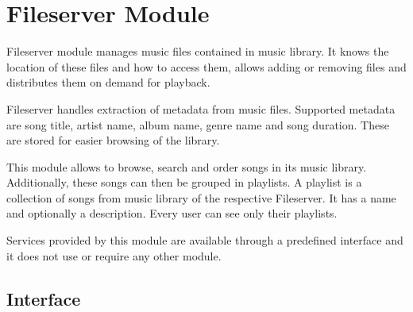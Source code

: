 \section{Fileserver Module}

Fileserver module manages music files contained in music library. It knows the location of these files and how to access them, allows adding or removing files and distributes them on demand for playback.
\par
Fileserver handles extraction of metadata from music files. Supported metadata are song title, artist name, album name, genre name and song duration. These are stored for easier browsing of the library.
\par
This module allows to browse, search and order songs in its music library. Additionally, these songs can then be grouped in playlists. A playlist is a collection of songs from music library of the respective Fileserver. It has a name and optionally a description. Every user can see only their playlists.
\par
Services provided by this module are available through a predefined interface and it does not use or require any other module.

\subsection{Interface}

